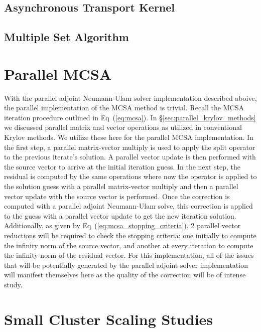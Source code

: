 \subsection{Asynchronous Transport Kernel}
\label{subsec:async_transport_kernel}

\subsection{Multiple Set Algorithm}
\label{subsec:multiple_sets_algorithm}

\section{Parallel MCSA}
\label{sec:parallel_mcsa}
With the parallel adjoint Neumann-Ulam solver implementation described
aboive, the parallel implementation of the MCSA method is
trivial. Recall the MCSA iteration procedure outlined in
Eq~(\ref{eq:mcsa}). In \S\ref{sec:parallel_krylov_methods} we
discussed parallel matrix and vector operations as utilized in
conventional Krylov methods. We utilize these here for the parallel
MCSA implementation. In the first step, a parallel matrix-vector
multiply is used to apply the split operator to the previous iterate's
solution. A parallel vector update is then performed with the source
vector to arrive at the initial iteration guess. In the next step, the
residual is computed by the same operations where now the operator is
applied to the solution guess with a parallel matrix-vector multiply
and then a parallel vector update with the source vector is
performed. Once the correction is computed with a parallel adjoint
Neumann-Ulam solve, this correction is applied to the guess with a
parallel vector update to get the new iteration
solution. Additionally, as given by
Eq~(\ref{eq:mcsa_stopping_criteria}), 2 parallel vector reductions
will be required to check the stopping criteria: one initially to
compute the infinity norm of the source vector, and another at every
iteration to compute the infinity norm of the residual vector. For
this implementation, all of the issues that will be potentially
generated by the parallel adjoint solver implementation will manifest
themselves here as the quality of the correction will be of intense
study.

\section{Small Cluster Scaling Studies}
\label{sec:small_scaling_studies}


